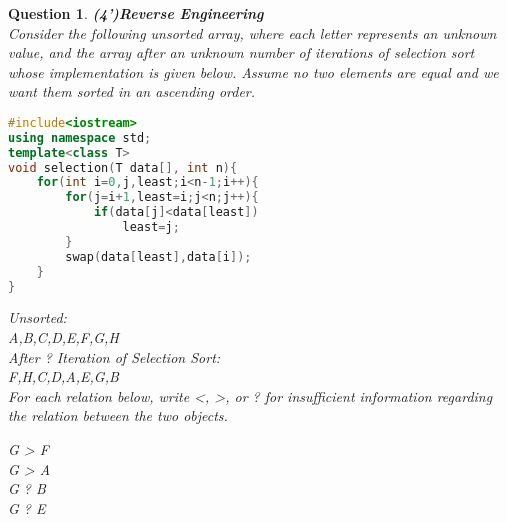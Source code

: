 \documentclass[10.5pt]{article}
\newtheorem{Q}{Question}
\begin{document}
	\begin{Q}\textbf{(4')Reverse Engineering}\\
        Consider the following unsorted array, where each letter represents an unknown value, and the array after an unknown number of iterations of selection sort whose implementation is given below. Assume no two elements are equal and we want them sorted in an ascending order.

\hrulefill
\rm{
\begin{lstlisting}[language=C++]
#include<iostream>
using namespace std;
template<class T>
void selection(T data[], int n){
	for(int i=0,j,least;i<n-1;i++){
		for(j=i+1,least=i;j<n;j++){
			if(data[j]<data[least])
				least=j;
		}
		swap(data[least],data[i]);
	}
}
\end{lstlisting}
}

		\vspace{1cm}
		Unsorted:\\
		A,B,C,D,E,F,G,H\\


		After ? Iteration of Selection Sort:\\
		F,H,C,D,A,E,G,B\\
        

        For each relation below, write \textless, \textgreater, or ? for insufficient information regarding the relation between the two objects.\\

		\begin{center}
		G > F\\

		G > A\\

		G ? B\\

		G ? E\\
		\end{center}


	
       
	\end{Q}
	
	
	
\pagebreak
	
\end{document}
